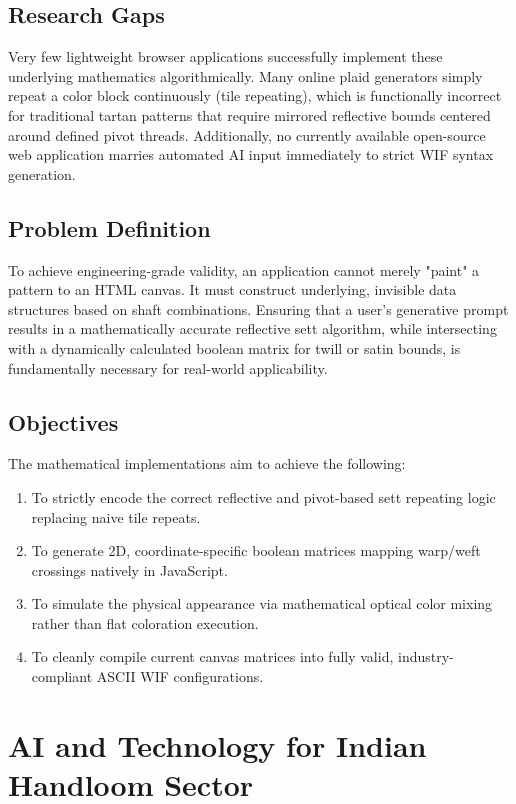 \subsection{Research Gaps}
Very few lightweight browser applications successfully implement these underlying mathematics algorithmically. Many online plaid generators simply repeat a color block continuously (tile repeating), which is functionally incorrect for traditional tartan patterns that require mirrored reflective bounds centered around defined pivot threads. Additionally, no currently available open-source web application marries automated AI input immediately to strict WIF syntax generation. 

\subsection{Problem Definition}
To achieve engineering-grade validity, an application cannot merely "paint" a pattern to an HTML canvas. It must construct underlying, invisible data structures based on shaft combinations. Ensuring that a user's generative prompt results in a mathematically accurate reflective sett algorithm, while intersecting with a dynamically calculated boolean matrix for twill or satin bounds, is fundamentally necessary for real-world applicability.

\subsection{Objectives}
The mathematical implementations aim to achieve the following:
\begin{enumerate}
    \item To strictly encode the correct reflective and pivot-based sett repeating logic replacing naive tile repeats.
    \item To generate 2D, coordinate-specific boolean matrices mapping warp/weft crossings natively in JavaScript.
    \item To simulate the physical appearance via mathematical optical color mixing rather than flat coloration execution.
    \item To cleanly compile current canvas matrices into fully valid, industry-compliant ASCII WIF configurations.
\end{enumerate}

\section{AI and Technology for Indian Handloom Sector}

